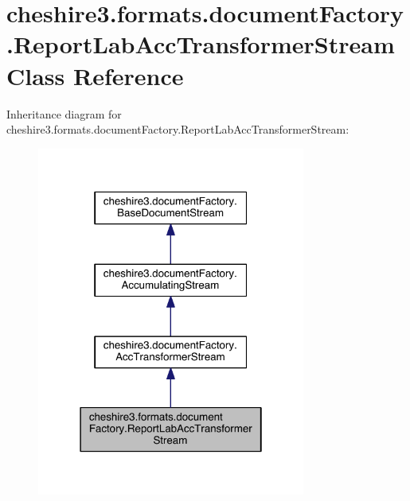 \hypertarget{classcheshire3_1_1formats_1_1document_factory_1_1_report_lab_acc_transformer_stream}{\section{cheshire3.\-formats.\-document\-Factory.\-Report\-Lab\-Acc\-Transformer\-Stream Class Reference}
\label{classcheshire3_1_1formats_1_1document_factory_1_1_report_lab_acc_transformer_stream}
}


Inheritance diagram for cheshire3.\-formats.\-document\-Factory.\-Report\-Lab\-Acc\-Transformer\-Stream\-:
\nopagebreak
\begin{figure}[H]
\begin{center}
\leavevmode
\includegraphics[width=250pt]{classcheshire3_1_1formats_1_1document_factory_1_1_report_lab_acc_transformer_stream__inherit__graph}
\end{center}
\end{figure}



